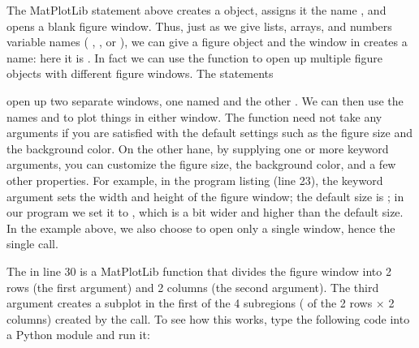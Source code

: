 \documentclass[letterpaper,10pt,english]{sphinxmanual}
\begin{document}
\sphinxAtStartPar
The MatPlotLib statement above creates a  object, assigns it the name , and opens a blank figure window.  Thus, just as we give lists, arrays, and numbers variable names ( , , or ), we can give a figure object and the window in creates a name: here it is .  In fact we can use the  function to open up multiple figure objects with different figure windows.  The statements

\begin{sphinxVerbatim}[commandchars=\\\{\}]
  
  
\end{sphinxVerbatim}

\sphinxAtStartPar
open up two separate windows, one named  and the other .  We can then use the names  and  to plot things in either window.  The  function need not take any arguments if you are satisfied with the default settings such as the figure size and the background color.  On the other hane, by supplying one or more keyword arguments, you can customize the figure size, the background color, and a few other properties.  For example, in the program listing (line 23), the keyword argument  sets the width and height of the figure window; the default size is ; in our program we set it to , which is a bit wider and higher than the default size.  In the example above, we also choose to open only a single window, hence the single  call.

\sphinxAtStartPar
The  in line 30 is a MatPlotLib function that divides the figure window into 2 rows (the first argument) and 2 columns (the second argument).  The third argument creates a subplot in the first of the 4 subregions ( of the 2 rows \(\times\) 2 columns) created by the  call.   To see how this works, type the following code into a Python module and run it:
\end{document}
